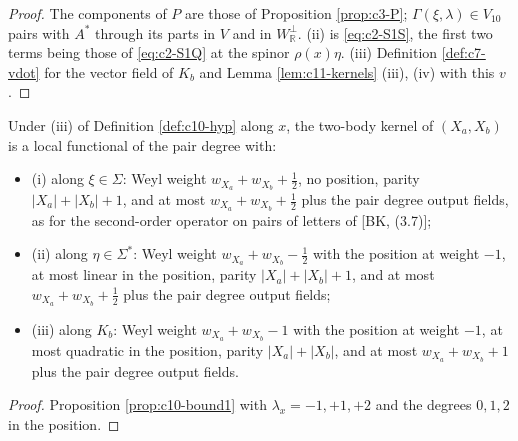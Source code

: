 \begin{proof}
The components of $P$ are those of Proposition \ref{prop:c3-P}; $\Gamma(\xi,\lambda)\in V_{10}$ pairs with $A^*$ through its parts in $V$ and in $W_{\mathbb R}^\perp$. (ii) is \eqref{eq:c2-S1S}, the first two terms being those of \eqref{eq:c2-S1Q} at the spinor $\rho(x)\eta$. (iii) Definition \ref{def:c7-vdot} for the vector field of $K_b$ and Lemma \ref{lem:c11-kernels} (iii), (iv) with this $v$.
\end{proof}

\begin{proposition}
\label{prop:c11-oddbound}
Under (iii) of Definition \ref{def:c10-hyp} along $x$, the two-body kernel of $(X_a,X_b)$ is a local functional of the pair degree with:
\begin{itemize}
\item (i) along $\xi\in\Sigma$: Weyl weight $w_{X_a}+w_{X_b}+\tfrac12$, no position, parity $|X_a|+|X_b|+1$, and at most $w_{X_a}+w_{X_b}+\tfrac12$ plus the pair degree output fields, as for the second-order operator on pairs of letters of [BK, (3.7)];
\item (ii) along $\eta\in\Sigma^*$: Weyl weight $w_{X_a}+w_{X_b}-\tfrac12$ with the position at weight $-1$, at most linear in the position, parity $|X_a|+|X_b|+1$, and at most $w_{X_a}+w_{X_b}+\tfrac12$ plus the pair degree output fields;
\item (iii) along $K_b$: Weyl weight $w_{X_a}+w_{X_b}-1$ with the position at weight $-1$, at most quadratic in the position, parity $|X_a|+|X_b|$, and at most $w_{X_a}+w_{X_b}+1$ plus the pair degree output fields.
\end{itemize}
\end{proposition}

\begin{proof}
Proposition \ref{prop:c10-bound1} with $\lambda_x=-1,+1,+2$ and the degrees $0,1,2$ in the position.
\end{proof}

